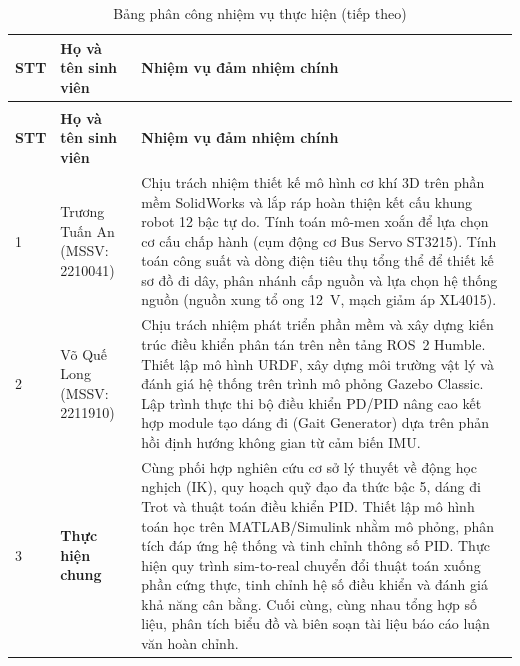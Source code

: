 \begingroup
\renewcommand{\arraystretch}{1.3}
\small
\begin{longtable}{|p{}|p{}|p{}|}
    \caption{Bảng phân công nhiệm vụ thực hiện}
    \label{tab:phan_cong} \\
    \hline
    \textbf{STT} & \textbf{Họ và tên sinh viên} & \textbf{Nhiệm vụ đảm nhiệm chính} \\ \hline
    \endfirsthead
    
    \caption[]{Bảng phân công nhiệm vụ thực hiện (tiếp theo)} \\
    \hline
    \textbf{STT} & \textbf{Họ và tên sinh viên} & \textbf{Nhiệm vụ đảm nhiệm chính} \\ \hline
    \endhead
    
    \hline
    \endfoot
    
    \hline
    \endlastfoot

    1 & Trương Tuấn An \newline (MSSV: 2210041) & 
    Chịu trách nhiệm thiết kế mô hình cơ khí 3D trên phần mềm SolidWorks và lắp ráp hoàn thiện kết cấu khung robot 12 bậc tự do. Tính toán mô-men xoắn để lựa chọn cơ cấu chấp hành (cụm động cơ Bus Servo ST3215). Tính toán công suất và dòng điện tiêu thụ tổng thể để thiết kế sơ đồ đi dây, phân nhánh cấp nguồn và lựa chọn hệ thống nguồn (nguồn xung tổ ong 12~V, mạch giảm áp XL4015). \\ \hline
    
    2 & Võ Quế Long \newline (MSSV: 2211910) & 
    Chịu trách nhiệm phát triển phần mềm và xây dựng kiến trúc điều khiển phân tán trên nền tảng ROS~2 Humble. Thiết lập mô hình URDF, xây dựng môi trường vật lý và đánh giá hệ thống trên trình mô phỏng Gazebo Classic. Lập trình thực thi bộ điều khiển PD/PID nâng cao kết hợp module tạo dáng đi (Gait Generator) dựa trên phản hồi định hướng không gian từ cảm biến IMU. \\ \hline
    
    3 & \textbf{Thực hiện chung} & 
    Cùng phối hợp nghiên cứu cơ sở lý thuyết về động học nghịch (IK), quy hoạch quỹ đạo đa thức bậc 5, dáng đi Trot và thuật toán điều khiển PID. Thiết lập mô hình toán học trên MATLAB/Simulink nhằm mô phỏng, phân tích đáp ứng hệ thống và tinh chỉnh thông số PID. Thực hiện quy trình sim-to-real chuyển đổi thuật toán xuống phần cứng thực, tinh chỉnh hệ số điều khiển và đánh giá khả năng cân bằng. Cuối cùng, cùng nhau tổng hợp số liệu, phân tích biểu đồ và biên soạn tài liệu báo cáo luận văn hoàn chỉnh. \\
\end{longtable}
\endgroup

